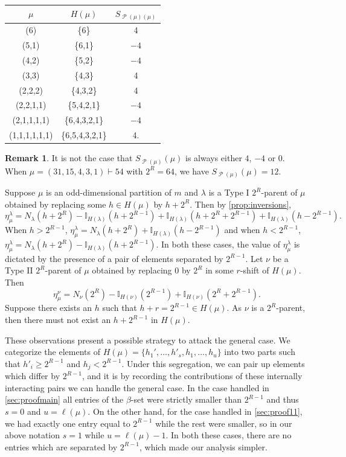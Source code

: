 \documentclass[12pt]{amsart}
\theoremstyle{definition}
\newtheorem{remark}[theorem]{Remark}
\numberwithin{equation}{section}
\newcommand{\la}{\lambda}
\DeclareMathOperator{\p}{\mathcal{P}}
\begin{document}
\begin{table}[H]
    \centering
    \begin{tabular}{c|c|c}
        $\mu$ & $H(\mu)$ & $S_{\p(\mu)(\mu)}$ \\
        \hline
         (6)& \{6\}& 4\\
         (5,1)& \{6,1\}& $-4$\\
         (4,2)& \{5,2\}& $-4$\\
         (3,3)& \{4,3\}& 4\\
         (2,2,2) & \{4,3,2\} & 4\\
         (2,2,1,1) & \{5,4,2,1\} & $-4$\\
         (2,1,1,1,1) & \{6,4,3,2,1\} & $-4$\\
         (1,1,1,1,1,1) & \{6,5,4,3,2,1\} & 4.
    \end{tabular}
\end{table}

\begin{remark}
    It is not the case that $S_{\p(\mu)}(\mu)$ is always either $4$, $-4$ or 0. When $\mu = (31,15,4,3,1)\vdash 54$ with $2^R = 64$, we have $S_{\p(\mu)}(\mu) = 12$.
\end{remark}

Suppose $\mu$ is an odd-dimensional partition of $m$ and $\la$ is a Type I $2^R$-parent of $\mu$ obtained by replacing some $h\in H(\mu)$ by $h+2^R$. Then by \cref{prop:inversions},
\[
\eta^\la_\mu = N_\la(h+2^R) - \mathbb{I}_{H(\la)}(h + 2^{R-1}) + \mathbb{I}_{H(\la)}(h + 2^R + 2^{R-1})  + \mathbb{I}_{H(\la)}(h -2^{R-1}).
\]
When $h > 2^{R-1}$, 
$\eta^\la_\mu = N_\la(h+2^R) + \mathbb{I}_{H(\la)}(h -2^{R-1})$ and when $h < 2^{R-1}$, 
$\eta^\la_\mu = N_\la(h+2^R) - \mathbb{I}_{H(\la)}(h + 2^{R-1})$. In both these cases, the value of $\eta^\la_\mu$ is dictated by the presence of a pair of elements separated by $2^{R-1}$. Let $\nu$ be a Type II $2^R$-parent of $\mu$ obtained by replacing 0 by $2^R$ in some $r$-shift of $H(\mu)$. Then 
\[
\eta^\nu_\mu = N_\nu(2^R) - \mathbb{I}_{H(\nu)}(2^{R-1}) + \mathbb{I}_{H(\nu)}(2^R + 2^{R-1}).
\]
Suppose there exists an $h$ such that $h+r = 2^{R-1}\in H(\mu)$. As $\nu$ is a $2^R$-parent, then there must not exist an $h+2^{R-1}$ in $H(\mu)$.

These observations present a possible strategy to attack the general case. We categorize the elements of $H(\mu) = \{h_1', \ldots, h'_s, h_1, \ldots, h_u\}$ into two parts such that $h'_i \geq 2^{R-1}$ and $h_j < 2^{R-1}$. Under this segregation, we can pair up elements which differ by $2^{R-1}$, and it is by recording the contributions of these internally interacting pairs we can handle the general case.
In the case handled in \cref{sec:proofmain} all entries of the $\beta$-set were strictly smaller than $2^{R-1}$ and thus $s = 0$ and $u = \ell(\mu)$. On the other hand, for the case handled in \cref{sec:proof11}, we had exactly one entry equal to $2^{R-1}$ while the rest were smaller, so in our above notation $s = 1$ while $u = \ell(\mu) - 1$. In both these cases, there are no entries which are separated by $2^{R-1}$, which made our analysis simpler.
\end{document}
